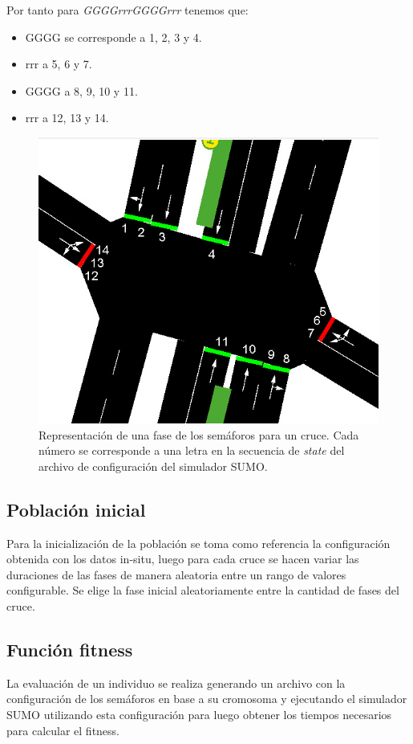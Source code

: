 Por tanto para \emph{GGGGrrrGGGGrrr} tenemos que:
\begin{itemize}
\item GGGG se corresponde a 1, 2, 3 y 4. 
\item rrr a 5, 6 y 7. 
\item GGGG a 8, 9, 10 y 11. 
\item rrr a 12, 13 y 14. 
\end{itemize}
  




\begin{figure}[H]
	\centering
	\includegraphics[width=0.7\linewidth]{Figures/semaforos_numerado}
	\caption{Representación de una fase de los semáforos para un cruce. Cada número se corresponde a una letra en la secuencia de \emph{state} del archivo de configuración del simulador SUMO.}
	\label{fig:sem_numerados}
\end{figure}

\subsection{Población inicial}

Para la inicialización de la población se toma como referencia
la configuración obtenida con los datos in-situ, luego para cada
cruce se hacen variar las duraciones de las fases de manera aleatoria entre un rango de valores configurable. Se elige la fase inicial aleatoriamente entre la cantidad de fases del cruce.

\subsection{Función fitness}
La evaluación de un individuo se realiza generando un archivo con la configuración de los semáforos en base a su cromosoma y ejecutando el simulador SUMO utilizando esta configuración para luego obtener los tiempos necesarios para calcular el fitness.

